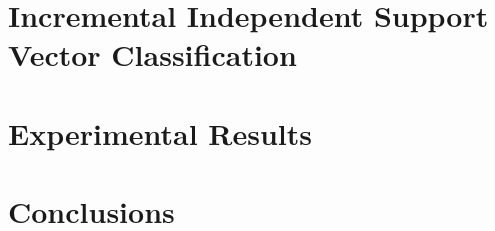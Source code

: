 \documentclass[10pt,twocolumn,letterpaper]{article}
\begin{document}
\section{Incremental Independent Support Vector Classification}
\label{sec:opt}


\section{Experimental Results}
\label{sec:exp}


\section{Conclusions}
\label{sec:concl}


{\small


}
\end{document}

